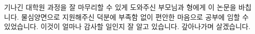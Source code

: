 \begin{acknowledgement}
  기나긴 대학원 과정을 잘 마무리할 수 있게 도와주신 부모님과 형에게 이 논문을 바칩니다.
  물심양면으로 지원해주신 덕분에 부족함 없이 편안한 마음으로 공부에 임할 수 있었습니다.
  이것이 얼마나 감사할 일인지 잘 알고 있습니다. 갚아나가며 살겠습니다.


  

  
\end{acknowledgement}
